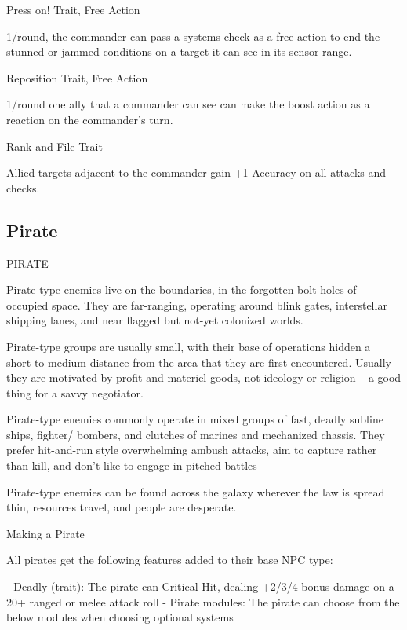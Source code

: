 Press on!  
Trait, Free Action
 
1/round, the commander can pass a systems check as a free action to end the stunned or  
jammed conditions on a target it can see in its sensor range.
 

Reposition  
Trait, Free Action
 
1/round one ally that a commander can see can make the boost action as a reaction on the  
commander’s turn.
 

Rank and File  
Trait
 
Allied targets adjacent to the commander gain +1 Accuracy on all attacks and checks.
 

                                                                                                                
\subsection{Pirate}

                                                   PIRATE  

Pirate-type enemies live on the boundaries, in the forgotten bolt-holes of occupied space. They  
are far-ranging, operating around blink gates, interstellar shipping lanes, and near flagged but  
not-yet colonized worlds.   

Pirate-type groups are usually small, with their base of operations hidden a short-to-medium  
distance from the area that they are first encountered. Usually they are motivated by profit and  
materiel goods, not ideology or religion -- a good thing for a savvy negotiator.    

Pirate-type enemies commonly operate in mixed groups of fast, deadly subline ships, fighter/ 
bombers, and clutches of marines and mechanized chassis. They prefer hit-and-run style  
overwhelming ambush attacks, aim to capture rather than kill, and don’t like to engage in pitched  
battles  
 

Pirate-type enemies can be found across the galaxy wherever the law is spread thin, resources  
travel, and people are desperate.   

Making a Pirate
 
All pirates get the following features added to their base NPC type:
 
    -    Deadly (trait): The pirate can Critical Hit, dealing +2/3/4 bonus damage on a 20+ ranged  
         or melee attack roll  
    -    Pirate modules: The pirate can choose from the below modules when choosing optional  
         systems  

